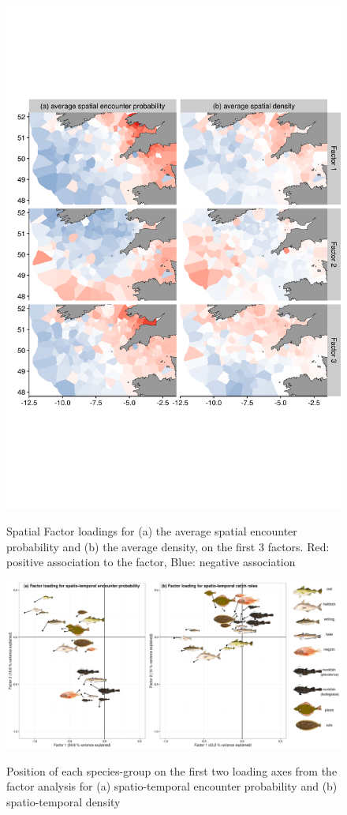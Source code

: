 \documentclass{article}
\begin{document}
\begin{figure}
\begin{center}
	\includegraphics[width=0.8\linewidth]{"Figure 2 - SpatialFactorLoadingsOmega1Omega2"}
	\label{fig:1}
	\caption{Spatial Factor loadings for (a) the average spatial encounter
		probability and (b) the average density,  on the first 3
		factors. Red: positive association to the factor, Blue:
		negative association}
\end{center}
\end{figure}


\begin{figure}
\begin{center}
	\includegraphics[width=\linewidth]{"Figure 3 - PCAstyle_Plots_SpatioTemp"}
	\label{fig:2}
	\caption{Position of each species-group on the first two loading axes from the
	factor analysis for (a) spatio-temporal encounter probability and (b)
	spatio-temporal density}
\end{center}
\end{figure}
\end{document}
